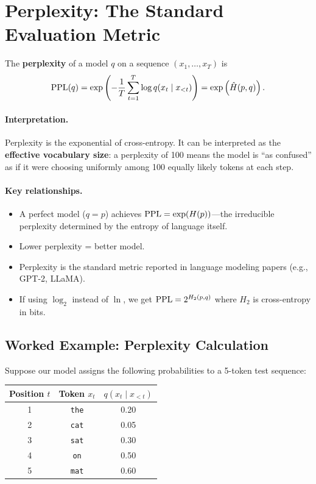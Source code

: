 \section{Perplexity: The Standard Evaluation Metric}
\label{ch:01:sec:perplexity}

\begin{definition}[Perplexity]
\label{def:01:perplexity}
The \textbf{perplexity} of a model $q$ on a sequence $(x_1, \ldots, x_T)$ is
\begin{equation}
\label{eq:01:perplexity}
\operatorname{PPL}(q) = \exp\left(-\frac{1}{T}\sum_{t=1}^T \log q(x_t \mid x_{<t})\right) = \exp\left(\hat{H}(p, q)\right).
\end{equation}
\end{definition}

\paragraph{Interpretation.} Perplexity is the exponential of cross-entropy. It can be interpreted as the \textbf{effective vocabulary size}: a perplexity of 100 means the model is ``as confused'' as if it were choosing uniformly among 100 equally likely tokens at each step.

\paragraph{Key relationships.}
\begin{itemize}
  \item A perfect model ($q = p$) achieves $\operatorname{PPL} = \exp(H(p))$---the irreducible perplexity determined by the entropy of language itself.
  \item Lower perplexity = better model.
  \item Perplexity is the standard metric reported in language modeling papers (e.g., GPT-2, LLaMA).
  \item If using $\log_2$ instead of $\ln$, we get $\operatorname{PPL} = 2^{H_2(p,q)}$ where $H_2$ is cross-entropy in bits.
\end{itemize}

\subsection{Worked Example: Perplexity Calculation}

Suppose our model assigns the following probabilities to a 5-token test sequence:
\begin{center}
\begin{tabular}{ccc}
\toprule
Position $t$ & Token $x_t$ & $q(x_t \mid x_{<t})$ \\
\midrule
1 & \texttt{the} & 0.20 \\
2 & \texttt{cat} & 0.05 \\
3 & \texttt{sat} & 0.30 \\
4 & \texttt{on} & 0.50 \\
5 & \texttt{mat} & 0.60 \\
\bottomrule
\end{tabular}
\end{center}

